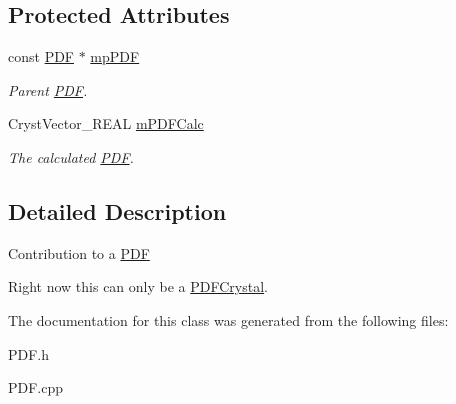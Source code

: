 \subsection*{Protected Attributes}
\begin{DoxyCompactItemize}
\item 
\mbox{\label{class_obj_cryst_1_1_p_d_f_phase_af78b7394beb2e1839d6cc75b700be0f6}} 
const \mbox{\hyperlink{class_obj_cryst_1_1_p_d_f}{P\+DF}} $\ast$ \mbox{\hyperlink{class_obj_cryst_1_1_p_d_f_phase_af78b7394beb2e1839d6cc75b700be0f6}{mp\+P\+DF}}
\begin{DoxyCompactList}\small\item\em Parent \mbox{\hyperlink{class_obj_cryst_1_1_p_d_f}{P\+DF}}. \end{DoxyCompactList}\item 
\mbox{\label{class_obj_cryst_1_1_p_d_f_phase_a39fa93f83ac731cfa4ee69f8add3e70d}} 
Cryst\+Vector\+\_\+\+R\+E\+AL \mbox{\hyperlink{class_obj_cryst_1_1_p_d_f_phase_a39fa93f83ac731cfa4ee69f8add3e70d}{m\+P\+D\+F\+Calc}}
\begin{DoxyCompactList}\small\item\em The calculated \mbox{\hyperlink{class_obj_cryst_1_1_p_d_f}{P\+DF}}. \end{DoxyCompactList}\end{DoxyCompactItemize}


\subsection{Detailed Description}
Contribution to a \mbox{\hyperlink{class_obj_cryst_1_1_p_d_f}{P\+DF}}

Right now this can only be a \mbox{\hyperlink{class_obj_cryst_1_1_p_d_f_crystal}{P\+D\+F\+Crystal}}. 

The documentation for this class was generated from the following files\+:\begin{DoxyCompactItemize}
\item 
P\+D\+F.\+h\item 
P\+D\+F.\+cpp\end{DoxyCompactItemize}
